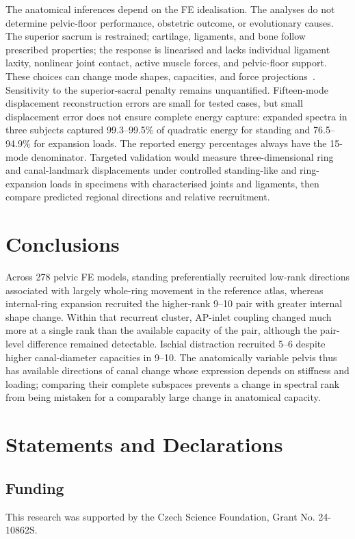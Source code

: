 \documentclass[pdflatex,sn-basic]{sn-jnl}
\begin{document}
The anatomical inferences depend on the FE idealisation. The analyses do not determine pelvic-floor performance, obstetric outcome, or evolutionary causes. The superior sacrum is restrained; cartilage, ligaments, and bone follow prescribed properties; the response is linearised and lacks individual ligament laxity, nonlinear joint contact, active muscle forces, and pelvic-floor support. These choices can change mode shapes, capacities, and force projections~\citep{Vleeming2012,Henys2022Ligaments}. Sensitivity to the superior-sacral penalty remains unquantified. Fifteen-mode displacement reconstruction errors are small for tested cases, but small displacement error does not ensure complete energy capture: expanded spectra in three subjects captured 99.3--99.5\% of quadratic energy for standing and 76.5--94.9\% for expansion loads. The reported energy percentages always have the 15-mode denominator. Targeted validation would measure three-dimensional ring and canal-landmark displacements under controlled standing-like and ring-expansion loads in specimens with characterised joints and ligaments, then compare predicted regional directions and relative recruitment.

\section{Conclusions}
Across 278 pelvic FE models, standing preferentially recruited low-rank directions associated with largely whole-ring movement in the reference atlas, whereas internal-ring expansion recruited the higher-rank 9--10 pair with greater internal shape change. Within that recurrent cluster, AP-inlet coupling changed much more at a single rank than the available capacity of the pair, although the pair-level difference remained detectable. Ischial distraction recruited 5--6 despite higher canal-diameter capacities in 9--10. The anatomically variable pelvis thus has available directions of canal change whose expression depends on stiffness and loading; comparing their complete subspaces prevents a change in spectral rank from being mistaken for a comparably large change in anatomical capacity.

\FloatBarrier
\section*{Statements and Declarations}
\subsection*{Funding}
This research was supported by the Czech Science Foundation, Grant No. 24-10862S.
\end{document}
